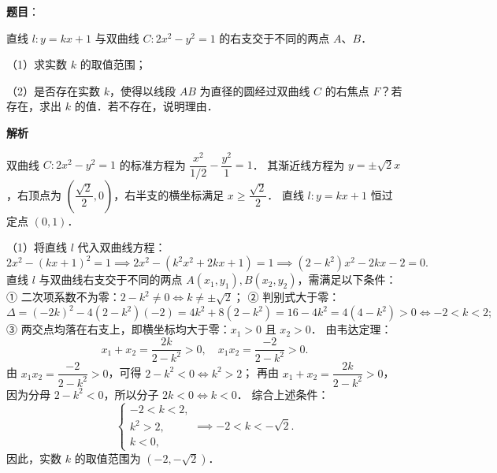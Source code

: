 \begin{answer}

\textbf{题目}：

直线 $l: y = kx + 1$ 与双曲线 $C: 2x^2 - y^2 = 1$ 的右支交于不同的两点 $A$、$B$．

（1）求实数 $k$ 的取值范围；

（2）是否存在实数 $k$，使得以线段 $AB$ 为直径的圆经过双曲线 $C$ 的右焦点 $F$？若存在，求出 $k$ 的值．若不存在，说明理由．

\textbf{解析}
\nopagebreak[4]
\begin{center}\end{center}
\nopagebreak[4]
双曲线 $C: 2x^2 - y^2 = 1$ 的标准方程为 $\dfrac{x^2}{1/2} - \dfrac{y^2}{1} = 1$．
其渐近线方程为 $y = \pm\sqrt{2}x$，右顶点为 $\left(\dfrac{\sqrt{2}}{2}, 0\right)$，右半支的横坐标满足 $x \geqslant \dfrac{\sqrt{2}}{2}$．
直线 $l: y = kx + 1$ 恒过定点 $(0, 1)$．

（1）将直线 $l$ 代入双曲线方程：
\nopagebreak[4]
\[
2x^2 - (kx + 1)^2 = 1 \implies 2x^2 - (k^2x^2 + 2kx + 1) = 1 \implies (2 - k^2)x^2 - 2kx - 2 = 0.
\]
直线 $l$ 与双曲线右支交于不同的两点 $A(x_1, y_1), B(x_2, y_2)$，需满足以下条件：
① 二次项系数不为零：$2 - k^2 \neq 0 \iff k \neq \pm\sqrt{2}$；
② 判别式大于零：
\nopagebreak[4]
\[
\Delta = (-2k)^2 - 4(2 - k^2)(-2) = 4k^2 + 8(2 - k^2) = 16 - 4k^2 = 4(4 - k^2) > 0 \iff -2 < k < 2;
\]
③ 两交点均落在右支上，即横坐标均大于零：$x_1 > 0$ 且 $x_2 > 0$．
由韦达定理：
\nopagebreak[4]
\[
x_1 + x_2 = \frac{2k}{2 - k^2} > 0, \quad x_1 x_2 = \frac{-2}{2 - k^2} > 0.
\]
由 $x_1 x_2 = \dfrac{-2}{2 - k^2} > 0$，可得 $2 - k^2 < 0 \iff k^2 > 2$；
再由 $x_1 + x_2 = \dfrac{2k}{2 - k^2} > 0$，因为分母 $2 - k^2 < 0$，所以分子 $2k < 0 \iff k < 0$．
综合上述条件：
\nopagebreak[4]
\[
\begin{cases}
-2 < k < 2, \\
k^2 > 2, \\
k < 0,
\end{cases}
\implies -2 < k < -\sqrt{2}.
\]
因此，实数 $k$ 的取值范围为 $(-2, -\sqrt{2})$．


\end{answer}
